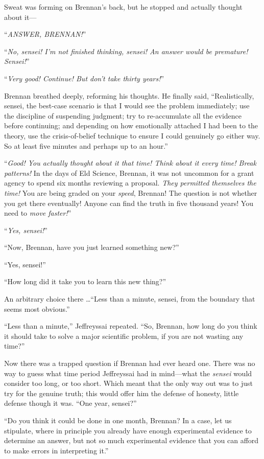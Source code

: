 {
 Sweat was forming on Brennan's back, but he
stopped and actually thought about it---}

{
 ``\textit{ANSWER, BRENNAN!}''}

{
 ``\textit{No, sensei! I'm not
finished thinking, sensei! An answer would be premature!
Sensei!}''}

{
 ``\textit{Very good! Continue! But
don't take thirty years!}''}

{
 Brennan breathed deeply, reforming his thoughts. He finally said,
``Realistically, sensei, the best-case scenario is
that I would see the problem immediately; use the discipline of
suspending judgment; try to re-accumulate all the evidence before
continuing; and depending on how emotionally attached I had been to the
theory, use the crisis-of-belief technique to ensure I could genuinely
go either way. So at least five minutes and perhaps up to an
hour.''}

{
 ``\textit{Good! You actually thought about it
that time! Think about it every time! Break patterns!} In the days of
Eld Science, Brennan, it was not uncommon for a grant agency to spend
six months reviewing a proposal. \textit{They permitted themselves the
time!} You are being graded on your \textit{speed}, Brennan! The
question is not whether you get there eventually! Anyone can find the
truth in five thousand years! You need to \textit{move
faster!}''}

{
 ``\textit{Yes, sensei!}''}

{
 ``Now, Brennan, have you just learned something
new?''}

{
 ``Yes, sensei!''}

{
 ``How long did it take you to learn this new
thing?''}

{
 An arbitrary choice there \ldots ``Less than a
minute, sensei, from the boundary that seems most
obvious.''}

{
 ``Less than a minute,''
Jeffreyssai repeated. ``So, Brennan, how long do you
think it should take to solve a major scientific problem, if you are
not wasting any time?''}

{
 Now there was a trapped question if Brennan had ever heard one.
There was no way to guess what time period Jeffreyssai had in
mind---what the \textit{sensei} would consider too long, or too short.
Which meant that the only way out was to just try for the genuine
truth; this would offer him the defense of honesty, little defense
though it was. ``One year,
sensei?''}

{
 ``Do you think it could be done in one month,
Brennan? In a case, let us stipulate, where in principle you already
have enough experimental evidence to determine an answer, but not so
much experimental evidence that you can afford to make errors in
interpreting it.''}


